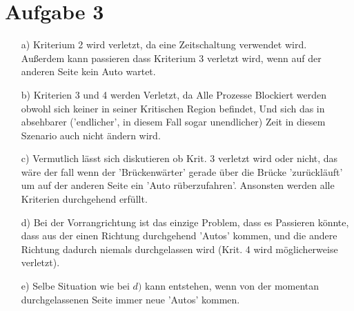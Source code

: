 \documentclass{scrartcl}
\begin{document}
\section*{Aufgabe 3}
\begin{itemize}
\item[a)]
Kriterium 2 wird verletzt, da eine Zeitschaltung verwendet wird. \\
Außerdem kann passieren dass Kriterium 3 verletzt wird, wenn auf der anderen Seite kein Auto wartet. \\
\item[b)]
Kriterien 3 und 4 werden Verletzt, da Alle Prozesse Blockiert werden obwohl sich keiner in seiner Kritischen Region befindet,
Und sich das in absehbarer ('endlicher', in diesem Fall sogar unendlicher) Zeit in diesem Szenario auch nicht ändern wird.
\item[c)]
Vermutlich lässt sich diskutieren ob Krit. 3 verletzt wird oder nicht, das wäre der fall wenn der 'Brückenwärter' gerade
über die Brücke 'zurückläuft' um auf der anderen Seite ein 'Auto rüberzufahren'.
Ansonsten werden alle Kriterien durchgehend erfüllt.
\item[d)]
Bei der Vorrangrichtung ist das einzige Problem, dass es Passieren könnte, dass aus der einen Richtung durchgehend
'Autos' kommen, und die andere Richtung dadurch niemals durchgelassen wird (Krit. 4 wird möglicherweise verletzt).
\item[e)]
Selbe Situation wie bei $d)$ kann entstehen, wenn von der momentan durchgelassenen Seite immer neue 'Autos' kommen.

\end{itemize}
\end{document}
